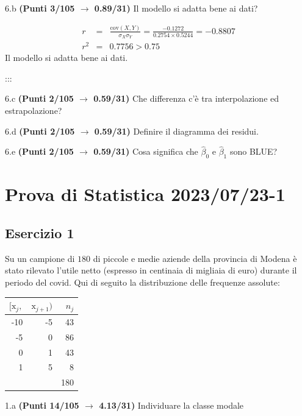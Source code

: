 \documentclass[
  11pt,
]{book}
\theoremstyle{mytheoremstyle}
\theoremstyle{mydefstyle}
\newenvironment{sol}
  {
  \begin{tcolorbox}[enhanced,breakable,arc=0.1mm,boxrule=1pt,colback=white,colframe=iblue,
  title=\bf \fontfamily{lmss}\selectfont \hspace{.5 cm} Soluzione,drop fuzzy shadow]

}{
\end{tcolorbox}
  }
\begin{document}
6.b \textbf{(Punti 3/105 \(\rightarrow\) 0.89/31)} Il modello si adatta bene ai dati?

\begin{sol}
\begin{eqnarray*}
r&=&\frac{\text{cov}(X,Y)}{\sigma_X\sigma_Y}=\frac{ -0.1272 }{ 0.2754 \times 0.5244 }= -0.8807 \\r^2&=& 0.7756 > 0.75
\end{eqnarray*}
Il modello si adatta bene ai dati.

\end{sol}

:::

6.c \textbf{(Punti 2/105 \(\rightarrow\) 0.59/31)} Che differenza c'è tra interpolazione ed estrapolazione?

6.d \textbf{(Punti 2/105 \(\rightarrow\) 0.59/31)} Definire il diagramma dei residui.

6.e \textbf{(Punti 2/105 \(\rightarrow\) 0.59/31)} Cosa significa che \(\hat\beta_0\) e \(\hat\beta_1\) sono BLUE?

\section{Prova di Statistica 2023/07/23-1}\label{prova-di-statistica-20230723-1}

\subsection{Esercizio 1}\label{esercizio-1-32}

Su un campione di \(180\) di piccole e medie aziende della provincia di Modena è stato rilevato l'utile netto (espresso in centinaia di migliaia di euro) durante il periodo del covid. Qui di seguito la distribuzione delle frequenze assolute:

\begin{table}[H]
\centering
\begin{tabular}{rrr}
\toprule
$[\text{x}_j,$ & $\text{x}_{j+1})$ & $n_j$\\
\midrule
-10 & -5 & 43\\
-5 & 0 & 86\\
0 & 1 & 43\\
1 & 5 & 8\\
 &  & 180\\
\bottomrule
\end{tabular}
\end{table}

1.a \textbf{(Punti 14/105 \(\rightarrow\) 4.13/31)} Individuare la classe modale
\end{document}
